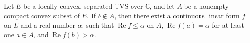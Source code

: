 Let $E$ be a locally convex, separated TVS over $\mathbb{C}$, and let $A$ be a nonempty compact convex subset of $E$. If $b \notin A$, then there exist a continuous linear form $f$ on $E$ and a real number $\alpha$, such that $\operatorname{Re} f \leq \alpha$ on $A$, $\operatorname{Re} f(a) = \alpha$ for at least one $a \in A$, and $\operatorname{Re} f(b) > \alpha$.